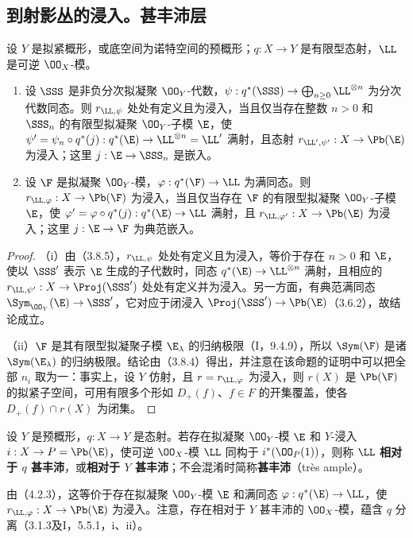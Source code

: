 \subsection{到射影丛的浸入。甚丰沛层}
设 $Y$ 是拟紧概形，或底空间为诺特空间的预概形；$q:X\to Y$ 是有限型态射，$\LL$ 是可逆 $\OO_X$-模。
\begin{enumerate}[label=(\roman*)]
\item 设 $\SSS$ 是非负分次拟凝聚 $\OO_Y$-代数，$\psi:q^*(\SSS)\to\bigoplus_{n\geq0}\LL^{\otimes n}$ 为分次代数同态。则 $r_{\LL,\psi}$ 处处有定义且为浸入，当且仅当存在整数 $n>0$ 和 $\SSS_n$ 的有限型拟凝聚 $\OO_Y$-子模 $\E$，使
$\psi'=\psi_n\circ q^*(j):q^*(\E)\to\LL^{\otimes n}=\LL'$ 满射，且态射 $r_{\LL',\psi'}:X\to\Pb(\E)$ 为浸入；这里 $j:\E\to\SSS_n$ 是嵌入。
\item 设 $\F$ 是拟凝聚 $\OO_Y$-模，$\varphi:q^*(\F)\to\LL$ 为满同态。则 $r_{\LL,\varphi}:X\to\Pb(\F)$ 为浸入，当且仅当存在 $\F$ 的有限型拟凝聚 $\OO_Y$-子模 $\E$，使 $\varphi'=\varphi\circ q^*(j):q^*(\E)\to\LL$ 满射，且 $r_{\LL,\varphi'}:X\to\Pb(\E)$ 为浸入；这里 $j:\E\to\F$ 为典范嵌入。
\end{enumerate}
\begin{proof}
（i）由（3.8.5），$r_{\LL,\psi}$ 处处有定义且为浸入，等价于存在 $n>0$ 和 $\E$，使以 $\SSS'$ 表示 $\E$ 生成的子代数时，同态 $q^*(\E)\to\LL^{\otimes n}$ 满射，且相应的 $r_{\LL,\psi'}:X\to\Proj(\SSS')$ 处处有定义并为浸入。另一方面，有典范满同态 $\Sym_{\OO_Y}(\E)\to\SSS'$，它对应于闭浸入 $\Proj(\SSS')\to\Pb(\E)$（3.6.2），故结论成立。

（ii）$\F$ 是其有限型拟凝聚子模 $\E_\lambda$ 的归纳极限（I，9.4.9），所以 $\Sym(\F)$ 是诸 $\Sym(\E_\lambda)$ 的归纳极限。结论由（3.8.4）得出，并注意在该命题的证明中可以把全部 $n_i$ 取为一：事实上，设 $Y$ 仿射，且 $r=r_{\LL,\varphi}$ 为浸入，则 $r(X)$ 是 $\Pb(\F)$ 的拟紧子空间，可用有限多个形如 $D_+(f)$、$f\in F$ 的开集覆盖，使各 $D_+(f)\cap r(X)$ 为闭集。
\end{proof}

设 $Y$ 是预概形，$q:X\to Y$ 是态射。若存在拟凝聚 $\OO_Y$-模 $\E$ 和 $Y$-浸入 $i:X\to P=\Pb(\E)$，使可逆 $\OO_X$-模 $\LL$ 同构于 $i^*(\OO_P(1))$，则称 $\LL$ \textbf{相对于 $q$ 甚丰沛}，或\textbf{相对于 $Y$ 甚丰沛}；不会混淆时简称\textbf{甚丰沛}（très ample）。

由（4.2.3），这等价于存在拟凝聚 $\OO_Y$-模 $\E$ 和满同态 $\varphi:q^*(\E)\to\LL$，使 $r_{\LL,\varphi}:X\to\Pb(\E)$ 为浸入。注意，存在相对于 $Y$ 甚丰沛的 $\OO_X$-模，蕴含 $q$ 分离（3.1.3及I，5.5.1，i、ii）。

